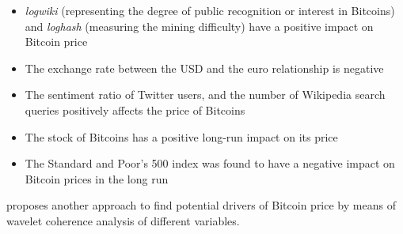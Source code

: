 \begin{itemize}
\item \textit{logwiki} (representing the degree of public recognition
  or interest in Bitcoins) and \textit{loghash} (measuring the mining
  difficulty) have a positive impact on Bitcoin price 
\item The exchange rate between the USD and the euro relationship is
  negative 
\item The sentiment ratio of Twitter users, and the number of
  Wikipedia search queries positively affects the price of Bitcoins
\item The stock of Bitcoins has a positive long-run impact on its
  price 
\item The Standard and Poor's 500 index was found to have a negative
  impact on Bitcoin prices in the long run
\end{itemize}

\cite{kristoufek_what_2015} proposes another approach to find
potential drivers of Bitcoin price by means of wavelet coherence
analysis of different variables.

